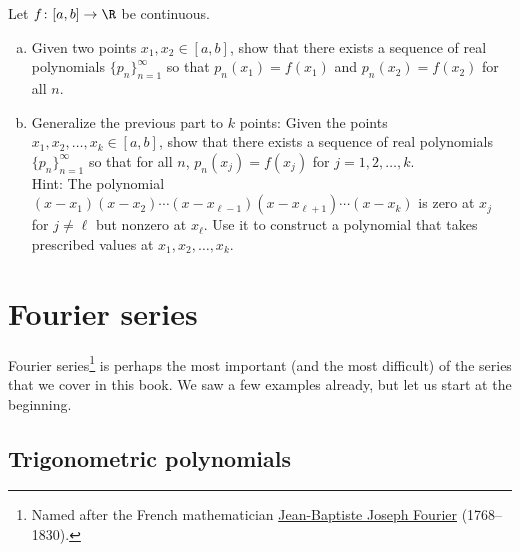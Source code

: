 \begin{exercise} \label{exercise:finitelymanyweierequal}
\pagebreak[2]
Let $f \colon [a,b] \to \R$ be continuous.
\begin{enumerate}[a)]
\item
Given two points $x_1,x_2 \in [a,b]$, show that
there exists a sequence of real polynomials $\{ p_n \}_{n=1}^\infty$
so that $p_n(x_1) = f(x_1)$ and $p_n(x_2) = f(x_2)$ for all $n$.
\item
Generalize the previous part to $k$ points:
Given the points $x_1,x_2,\ldots,x_k \in [a,b]$, show that
there exists a sequence of real polynomials $\{ p_n \}_{n=1}^\infty$
so that for all $n$, $p_n(x_j) = f(x_j)$ for $j=1,2,\ldots,k$.
\\
Hint: The polynomial $(x-x_1)(x-x_2)\cdots(x-x_{\ell-1})(x-x_{\ell+1})
\cdots(x-x_k)$ is zero at $x_j$ for $j\not=\ell$ but nonzero at
$x_\ell$.  Use it to construct a polynomial that takes prescribed values
at $x_1,x_2,\ldots,x_k$.
\end{enumerate}
\end{exercise}


\sectionnewpage
\section{Fourier series}
\label{sec:fourier}



Fourier series\footnote{%
Named after the French mathematician
\href{https://en.wikipedia.org/wiki/Joseph_Fourier}{Jean-Baptiste Joseph Fourier}
(1768--1830).} is perhaps the most important (and the most difficult)
of the series that we cover in
this book.  We saw a few examples already,
but let us start
at the beginning.

\subsection{Trigonometric polynomials}

